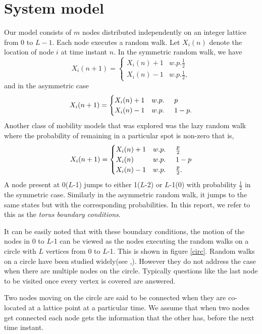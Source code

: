 \documentclass[a4paper,10pt,english]{article}
\begin{document}
\section{System model}\label{model}
Our model consists of $m$ nodes distributed independently on an integer lattice from 0 to $L-1$. Each node executes a random walk. Let $X_i(n)$ denote the location of node $i$ at time instant $n$. In the symmetric random walk, we have 
\begin{equation}
X_i(n+1)=
\begin{cases}
X_i(n)+1 &w.p. \frac{1}{2}\\
X_i(n)-1 &w.p. \frac{1}{2},
\end{cases}
\end{equation}
and in the asymmetric case 
\begin{equation}
X_i(n+1)=
\begin{cases}
X_i(n)+1 &w.p.\hspace{.5cm} p\\
X_i(n)-1 &w.p.\hspace{.5cm} 1-p.
\end{cases}
\end{equation}
Another class of mobility models that was explored was the lazy random walk where the probability of remaining in a particular spot is non-zero that is,
\begin{equation}
X_i(n+1)=
\begin{cases}
X_i(n)+1 &w.p.\hspace{.5cm} \frac{p}{2}\\
X_i(n)   &w.p.\hspace{.5cm} 1-p\\
X_i(n)-1 &w.p.\hspace{.5cm} \frac{p}{2}.
\end{cases}
\end{equation}
A node present at 0($L$-1) jumps to either 1($L$-2) or $L$-1(0) with probability $\frac{1}{2}$ in the symmetric case. Similarly in the asymmetric random walk, it jumps to the same states but with the corresponding probabilities. In this report, we refer to this as the \textit{torus boundary conditions}.
\par It can be easily noted that with these boundary conditions, the motion of the nodes in 0 to $L$-1 can be viewed as the nodes executing the random walks on a circle with $L$ vertices from 0 to $L$-1. This is shown in figure \ref{circ}. Random walks on a circle have been studied widely(see \cite{circle2},\cite{diaconis}). However they do not address the case when there are multiple nodes on the circle. Typically questions like the last node to be visited once every vertex is covered are answered.
\par Two nodes moving on the circle are said to be connected when they are co-located at a lattice point at a particular time. We assume that when two nodes get connected each node gets the information that the other has, before the next time instant.
\end{document}
